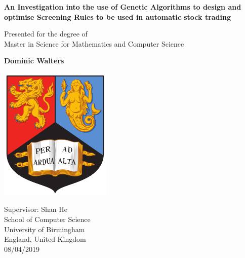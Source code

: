 \begin{titlepage}
    \begin{center}
        \vspace*{1cm}
        
        \Large
        \textbf{An Investigation into the use of Genetic Algorithms to design and optimise Screening Rules to be used in automatic stock trading}
        
        \vspace{0.5cm}
        \large
        Presented for the degree of \\
        Master in Science for Mathematics and Computer Science
        
        \vspace{0.5cm}
        \textbf{Dominic Walters}
        \vfill
        
        \includegraphics[width=0.4\textwidth]{images/uobLogo.png}
        
        \vspace{0.5cm}
        Supervisor: Shan He\\
        \vspace{0.5cm}
        School of Computer Science\\
        University of Birmingham\\
        England, United Kingdom\\
        08/04/2019
    \end{center}
\end{titlepage}